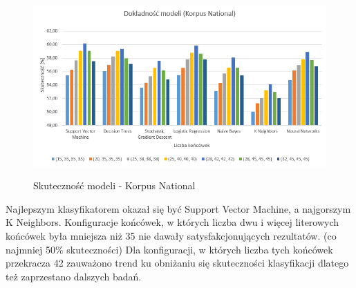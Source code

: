 \begin{figure}[!htbp]
	\centering
	\includegraphics[scale=0.8]{korpusnationalwykres}
	\label{Rysunek}
	\caption{Skuteczność modeli - Korpus National}
\end{figure}

Najlepszym klasyfikatorem okazał się być Support Vector Machine, a najgorszym K Neighbors. Konfiguracje końcówek, w których liczba dwu i więcej literowych końcówek była mniejsza niż 35 nie dawały satysfakcjonujących rezultatów. (co najmniej 50\% skuteczności) Dla konfiguracji, w których liczba tych końcówek przekracza 42 zauważono trend ku obniżaniu się skuteczności klasyfikacji dlatego też zaprzestano dalszych badań.
